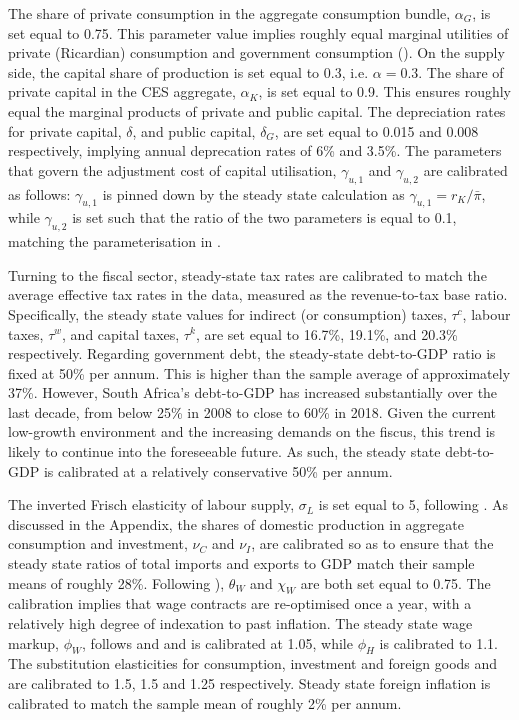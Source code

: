 \documentclass[a4paper,11pt]{article}
\numberwithin{equation}{section}
\begin{document}
	The share of private consumption in the aggregate consumption bundle, $\alpha_G$, is set equal to 0.75. This parameter value implies roughly equal marginal utilities of private (Ricardian) consumption and government consumption (\citealp{coenen2013}). On the supply side, the capital share of production is set equal to 0.3, i.e. $\alpha=0.3$. The share of private capital in the CES aggregate, $\alpha_K$, is set equal to 0.9. This ensures roughly equal the marginal products of private and public capital. The depreciation rates for private capital, $\delta$, and public capital, $\delta_G$, are set equal to 0.015 and 0.008 respectively, implying annual deprecation rates of 6\% and 3.5\%. The parameters that govern the adjustment cost of capital utilisation, $\gamma_{u,1}$ and $\gamma_{u,2}$ are calibrated as follows: $\gamma_{u,1}$ is pinned down by the steady state calculation as $\gamma_{u,1}=r_K/\bar{\pi}$, while $\gamma_{u,2}$ is set such that the ratio of the two parameters is equal to 0.1, matching the parameterisation in \cite{steinbach2014}. 
	
	Turning to the fiscal sector, steady-state tax rates are calibrated to match the average effective tax rates in the data, measured as the revenue-to-tax base ratio. Specifically, the steady state values for indirect (or consumption) taxes, $\tau^c$, labour taxes, $\tau^w$, and capital taxes, $\tau^k$, are set equal to 16.7\%, 19.1\%, and 20.3\% respectively. Regarding government debt, the steady-state debt-to-GDP ratio is fixed at 50\% per annum. This is higher than the sample average of approximately 37\%. However, South Africa's debt-to-GDP has increased substantially  over the last decade, from below 25\% in 2008 to close to 60\% in 2018. Given the current low-growth environment and the increasing demands on the fiscus, this trend is likely to continue into the foreseeable future. As such, the steady state debt-to-GDP is calibrated at a relatively conservative 50\% per annum.
	
	The inverted Frisch elasticity of labour supply, $\sigma_L$ is set equal to 5, following \cite{steinbach2014}. As discussed in the Appendix, the shares of domestic production in aggregate consumption and investment, $\nu_C$ and $\nu_I$, are calibrated so as to ensure that the steady state ratios of total imports and exports to GDP match their sample means of roughly 28\%. Following \citealp{steinbach2014}), $\theta_W$ and $\chi_W$ are both set equal to 0.75. The calibration implies that wage contracts are re-optimised once a year, with a relatively high degree of indexation to past inflation. The steady state wage markup, $\phi_W$, follows \cite{adolfson2007} and \cite{steinbach2014} and is calibrated at 1.05, while $\phi_H$ is calibrated to 1.1. The substitution elasticities for consumption, investment and foreign goods and are calibrated to 1.5, 1.5 and 1.25 respectively. Steady state foreign inflation is calibrated to match the sample mean of roughly 2\% per annum.
	
\end{document}
